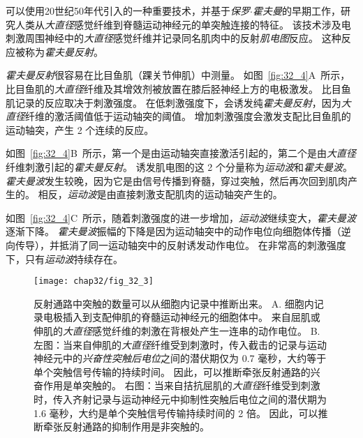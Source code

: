 \begin{proposition}[霍夫曼反射] \label{box:32_3}
	
	\quad \quad 可以使用20世纪50年代引入的一种重要技术，并基于\textit{保罗$\cdot$霍夫曼}的早期工作，研究人类从\textit{大直径}感觉纤维到脊髓运动神经元的单突触连接的特征。
	该技术涉及电刺激周围神经中的\textit{大直径}感觉纤维并记录同名肌肉中的反射\textit{肌电图}反应。
	这种反应被称为\textit{霍夫曼反射}。
	
	\quad \quad \textit{霍夫曼反射}很容易在比目鱼肌（踝关节伸肌）中测量。
	如图~\ref{fig:32_4}A~所示，比目鱼肌的\textit{大直径}纤维及其增效剂被放置在膝后胫神经上方的电极激发。
	比目鱼肌记录的反应取决于刺激强度。
	在低刺激强度下，会诱发纯\textit{霍夫曼反射}，因为\textit{大直径}纤维的激活阈值低于运动轴突的阈值。
	增加刺激强度会激发支配比目鱼肌的运动轴突，产生 2 个连续的反应。
	
	\quad \quad 如图~\ref{fig:32_4}B~所示，第一个是由运动轴突直接激活引起的，第二个是由\textit{大直径}纤维刺激引起的\textit{霍夫曼反射}。
	诱发肌电图的这 2 个分量称为\textit{运动波}和\textit{霍夫曼波}。
	\textit{霍夫曼波}发生较晚，因为它是由信号传播到脊髓，穿过突触，然后再次回到肌肉产生的。
	相反，\textit{运动波}是由直接刺激支配肌肉的运动轴突产生的。
	
	\quad \quad 如图~\ref{fig:32_4}C~所示，随着刺激强度的进一步增加，\textit{运动波}继续变大，\textit{霍夫曼波}逐渐下降。
	\textit{霍夫曼波}振幅的下降是因为运动轴突中的动作电位向细胞体传播（逆向传导），并抵消了同一运动轴突中的反射诱发动作电位。
	在非常高的刺激强度下，只有\textit{运动波}持续存在。
	
\end{proposition}


\begin{figure}[htbp]
	\centering
	\texttt{[image: chap32/fig\_32\_3]}
	\caption{反射通路中突触的数量可以从细胞内记录中推断出来。
		A. 细胞内记录电极插入到支配伸肌的脊髓运动神经元的细胞体中。
		来自屈肌或伸肌的\textit{大直径}感觉纤维的刺激在背根处产生一连串的动作电位。
		B. 左图：当来自伸肌的\textit{大直径}纤维受到刺激时，传入截击的记录与运动神经元中的\textit{兴奋性突触后电位}之间的潜伏期仅为 0.7 毫秒，大约等于单个突触信号传输的持续时间。
		因此，可以推断牵张反射通路的兴奋作用是单突触的。
		右图：当来自拮抗屈肌的\textit{大直径}纤维受到刺激时，传入齐射记录与运动神经元中抑制性突触后电位之间的潜伏期为 1.6 毫秒，大约是单个突触信号传输持续时间的 2 倍。
		因此，可以推断牵张反射通路的抑制作用是非突触的。}
	\label{fig:32_3}
\end{figure}




